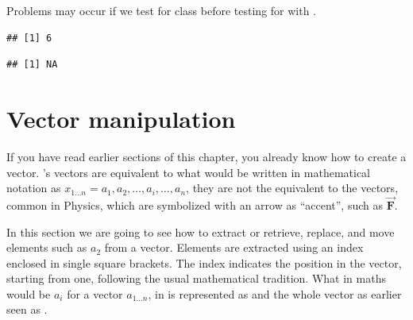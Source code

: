\documentclass[krantz2]{krantz}\usepackage{knitr}%
\begin{document}
\begin{explainbox}
Problems may occur if we test for class before testing for  with .

\begin{knitrout}\footnotesize
{}\color{fgcolor}\begin{kframe}
\begin{alltt}
 \hlkwb{<-} \hlopt{:}
 \hlstd{(} 
\end{alltt}
\begin{verbatim}
## [1] 6
\end{verbatim}
\begin{alltt}
 \hlkwb{<-} \hlstd{(}\hlstd{,}\hlstd{,}\hlstd{)}
 \hlstd{(} 
\end{alltt}
\begin{verbatim}
## [1] NA
\end{verbatim}
\begin{alltt}
 \hlkwb{<-} 
 \hlstd{(} 
\end{alltt}
\end{kframe}
\end{knitrout}
\end{explainbox}


\section{Vector manipulation}\label{sec:vectors}\label{sec:calc:indexing}
If you have read earlier sections of this chapter, you already know how to create a vector. \Rlang's vectors are equivalent to what would be written in mathematical notation as $x_{1\ldots n} = a_1, a_2, \ldots, a_i, \ldots, a_n$, they are not the equivalent to the vectors, common in Physics, which are symbolized with an arrow as ``accent'', such as $\overrightarrow{\mathbf{F}}$.

In this section we are going to see how to extract or retrieve, replace, and move elements such as $a_2$ from a vector. Elements are extracted using an index enclosed in single square brackets. The index indicates the position in the vector, starting from one, following the usual mathematical tradition. What in maths would be $a_i$ for a vector $a_{1\ldots n}$, in \Rpgrm is represented as  and the whole vector as earlier seen as .
\end{document}
